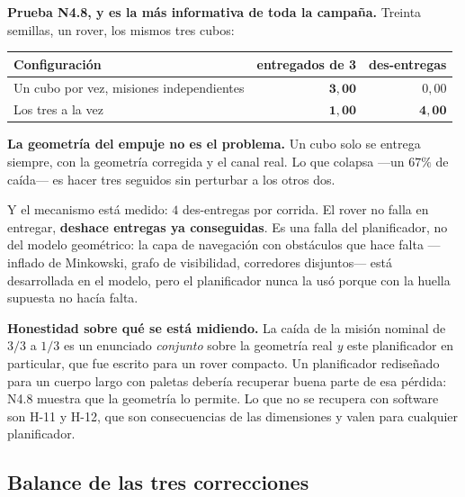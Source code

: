 \documentclass[11pt,a4paper]{article}
\begin{document}
\begin{tcolorbox}[colback=black!5,colframe=black!65,boxrule=0.7pt,arc=1pt]
\textbf{Prueba N4.8, y es la más informativa de toda la campaña.} Treinta semillas, un
rover, los mismos tres cubos:

\medskip
\centering
\begin{tabular}{lrr}
\toprule
Configuración & entregados de 3 & des-entregas \\
\midrule
Un cubo por vez, misiones independientes & $\mathbf{3{,}00}$ & $0{,}00$ \\
Los tres a la vez & $\mathbf{1{,}00}$ & $\mathbf{4{,}00}$ \\
\bottomrule
\end{tabular}

\raggedright
\medskip
\textbf{La geometría del empuje no es el problema.} Un cubo solo se entrega siempre, con
la geometría corregida y el canal real. Lo que colapsa ---un $67\%$ de caída--- es hacer
tres seguidos sin perturbar a los otros dos.

\smallskip
Y el mecanismo está medido: $4$ des-entregas por corrida. El rover no falla en entregar,
\textbf{deshace entregas ya conseguidas}. Es una falla del planificador, no del modelo
geométrico: la capa de navegación con obstáculos que hace falta ---inflado de Minkowski,
grafo de visibilidad, corredores disjuntos--- está desarrollada en el modelo, pero el
planificador nunca la usó porque con la huella supuesta no hacía falta.
\end{tcolorbox}

\begin{tcolorbox}[colback=black!3,colframe=black!50,boxrule=0.5pt,arc=1pt]
\textbf{Honestidad sobre qué se está midiendo.} La caída de la misión nominal de $3/3$ a
$1/3$ es un enunciado \emph{conjunto} sobre la geometría real \emph{y} este planificador
en particular, que fue escrito para un rover compacto. Un planificador rediseñado para un
cuerpo largo con paletas debería recuperar buena parte de esa pérdida: N4.8 muestra que la
geometría lo permite. Lo que no se recupera con software son H-11 y H-12, que son
consecuencias de las dimensiones y valen para cualquier planificador.
\end{tcolorbox}

\subsection{Balance de las tres correcciones}
\end{document}

